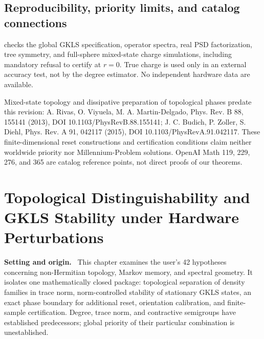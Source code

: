 \documentclass[11pt,a4paper,oneside]{book}
\newcommand{\note}[1]{\par\medskip\noindent\textbf{#1}\ }
\begin{document}
\section{Reproducibility, priority limits, and catalog connections}
 checks the global GKLS specification, operator spectra, real PSD factorization, tree symmetry, and full-sphere mixed-state charge simulations, including mandatory refusal to certify at $r=0$. True charge is used only in an external accuracy test, not by the degree estimator. No independent hardware data are available.

Mixed-state topology and dissipative preparation of topological phases predate this revision: A. Rivas, O. Viyuela, M. A. Martin-Delgado, Phys. Rev. B 88, 155141 (2013), DOI 10.1103/PhysRevB.88.155141; J. C. Budich, P. Zoller, S. Diehl, Phys. Rev. A 91, 042117 (2015), DOI 10.1103/PhysRevA.91.042117. These finite-dimensional reset constructions and certification conditions claim neither worldwide priority nor Millennium-Problem solutions. OpenAI Math 119, 229, 276, and 365 are catalog reference points, not direct proofs of our theorems.

\chapter{Topological Distinguishability and GKLS Stability under Hardware Perturbations}
\note{Setting and origin.} This chapter examines the user's 42 hypotheses concerning non-Hermitian topology, Markov memory, and spectral geometry. It isolates one mathematically closed package: topological separation of density families in trace norm, norm-controlled stability of stationary GKLS states, an exact phase boundary for additional reset, orientation calibration, and finite-sample certification. Degree, trace norm, and contractive semigroups have established predecessors; global priority of their particular combination is unestablished.
\end{document}
